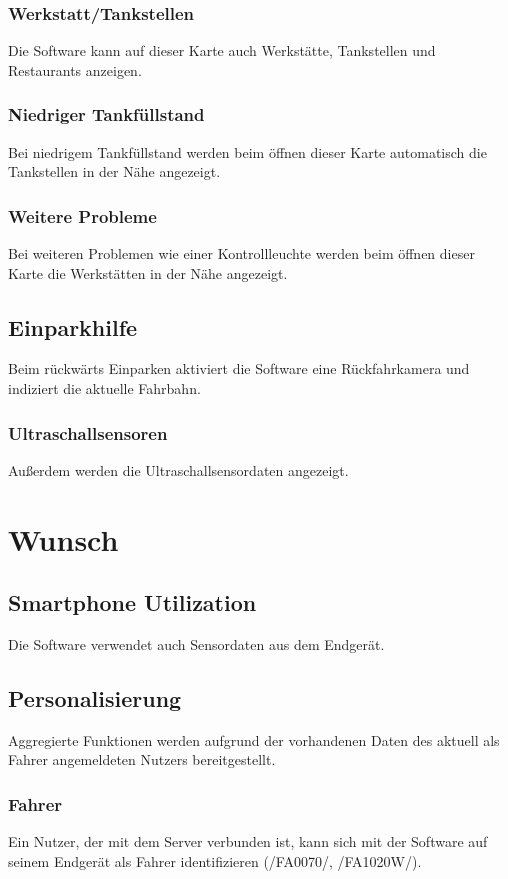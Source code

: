 \documentclass[pflichtenheft.tex]{subfiles}
\begin{document}
\subsubsection{\mkfa Werkstatt/Tankstellen}
Die Software kann auf dieser Karte auch Werkstätte, Tankstellen und Restaurants anzeigen.
\subsubsection{\mkfa Niedriger Tankfüllstand}
Bei niedrigem Tankfüllstand werden beim öffnen dieser Karte automatisch die Tankstellen in der Nähe angezeigt.
\subsubsection{\mkfa Weitere Probleme} %
Bei weiteren Problemen wie einer Kontrollleuchte werden beim öffnen dieser Karte die Werkstätten in der Nähe angezeigt.
\subsection{\mkfa Einparkhilfe}
Beim rückwärts Einparken aktiviert die Software eine Rückfahrkamera und indiziert die aktuelle Fahrbahn.
\subsubsection{\mkfa Ultraschallsensoren}
Außerdem werden die Ultraschallsensordaten angezeigt.

\section{Wunsch}

\subsection{\mkfaw Smartphone Utilization} Die Software verwendet auch Sensordaten aus dem Endgerät.
\subsection{\mkfaw Personalisierung} Aggregierte Funktionen werden aufgrund der vorhandenen Daten des aktuell als Fahrer angemeldeten Nutzers bereitgestellt.

\subsubsection{\mkfaw Fahrer} Ein Nutzer, der mit dem Server verbunden ist, kann sich mit der Software auf seinem Endgerät als Fahrer identifizieren (/FA0070/, /FA1020W/).
\end{document}
